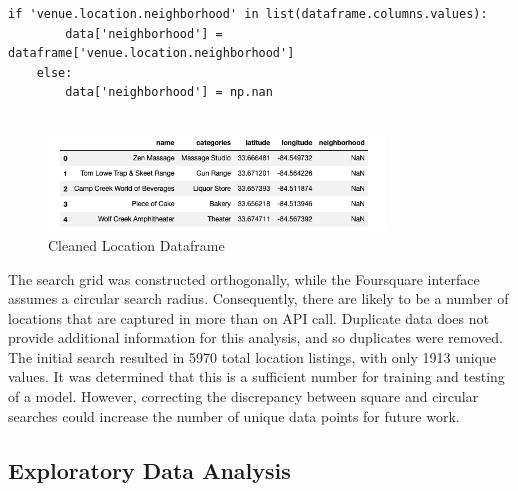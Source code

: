 \documentclass[11pt]{amsart}
\begin{document}
\begin{lstlisting}[caption={Neighborhood Data Screening Clause}]
 if 'venue.location.neighborhood' in list(dataframe.columns.values):
        data['neighborhood'] = dataframe['venue.location.neighborhood']
    else: 
        data['neighborhood'] = np.nan
        
\end{lstlisting}
\begin{figure}
\includegraphics[width=0.8\textwidth]{Foursquare_API_output_table_cleaned}
\caption{Cleaned Location Dataframe}
\label{tab:fsclean}
\end{figure}

The search grid was constructed orthogonally, while the Foursquare interface assumes a circular search radius. Consequently, there are likely to be a number of locations that are captured in more than on API call. Duplicate data does not provide additional information for this analysis, and so duplicates were removed. The initial search resulted in 5970 total location listings, with only 1913 unique values. It was determined that this is a sufficient number for training and testing of a model. However, correcting the discrepancy between square and circular searches could increase the number of unique data points for future work. 
\subsection{Exploratory Data Analysis}
\end{document}
